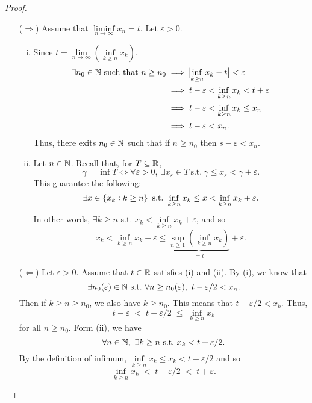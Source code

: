 \documentclass[11pt,openany]{article}
\begin{document}
\begin{proof}
\begin{enumerate}[(1)]
\begin{center}
\end{center}
\begin{itemize}
	\item[($\Rightarrow$)] Assume that $\liminf\limits_{n \to \infty} x_n=t$. Let $\varepsilon>0$. 
	\begin{enumerate}[(i)]
		\item Since $t=\lim\limits_{n\to\infty}\left(\inf\limits_{k\geq n}x_k\right)$, 
		\begin{align*}
			\exists n_0\in\mathbb{N}\ \text{such that}\ n\geq n_0&\implies\abs[1]{\inf\limits_{k\geq n}x_k-t}<\varepsilon \\
			& \implies t-\varepsilon< \inf\limits_{k\geq n} x_k<t+\varepsilon\\
			& \implies t-\varepsilon<\inf\limits_{k\geq n} x_k\leq x_n \\
			& \implies t-\varepsilon<x_n.
		\end{align*}
		Thus, there exits $n_0\in\mathbb{N}$ such that if $n\geq n_0$ then $s-\varepsilon<x_n$.
		\item Let $n\in\mathbb{N}$. Recall that, for $T\subseteq\mathbb{R}$, \[
		\boxed{\gamma=\inf T\iff\forall\varepsilon>0,\ \exists x_\varepsilon\in T\ \text{s.t.}\ \gamma\leq x_\varepsilon<\gamma+\varepsilon}.
		\] This guarantee the following: \[
		\exists x\in\set{x_k:k\geq n}\ \text{s.t.}\ \inf\limits_{k\geq n}x_k\leq x<\inf\limits_{k\geq n}x_k+\varepsilon.
		\] In other words, $\exists k\geq n$ s.t. $x_k<\inf\limits_{k\geq n}x_k+\varepsilon$, and so \[
		x_k<\inf\limits_{k\geq n}x_k+\varepsilon\leq\underbrace{\sup\limits_{n\geq 1}\left(\inf_{k\geq n}x_k\right)}_{=t}+\varepsilon.
		\]
		\end{enumerate}
	\item[($\Leftarrow$)] Let $\varepsilon>0$. Assume that $t\in\mathbb{R}$ satisfies (i) and (ii). By (i), we know that \[
	\exists n_0(\varepsilon)\in\N\ \text{s.t.}\ \forall n\geq n_0(\varepsilon),\ t-\varepsilon/2<x_n.
	\] Then if $k\geq n\geq n_0$, we also have $k\geq n_0$. This means that $t-\varepsilon/2<x_k$. Thus, \[
	t-\varepsilon \;<\; t-\varepsilon/2 \;\leq\; \inf\limits_{k\geq n}x_k
	\] for all $n\geq n_0$.
	Form (ii), we have \[
	\forall n\in\mathbb{N},\ \exists k\geq n\ \text{s.t.}\ x_k<t+\varepsilon/2.
	\] By the definition of infimum, $\inf\limits_{k\geq n} x_k\leq x_k<t+\varepsilon/2$ and so \[
	\inf\limits_{k\geq n} x_k \;<\; t+\varepsilon/2 \;<\; t+\varepsilon.
\]
\end{itemize}
\end{enumerate}
\end{proof}
\end{document}
